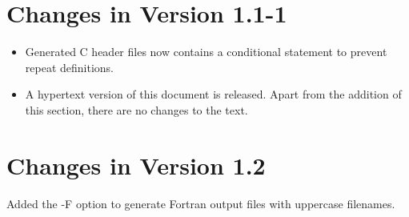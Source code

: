 \documentclass[11pt,nolof]{starlink}
\begin{document}
\section{Changes in Version 1.1-1}
\begin{itemize}
\item Generated C header files now contains a conditional statement to prevent
repeat definitions.
\item A hypertext version of this document is released. Apart from the
addition of this section, there are no changes to the text.
\end{itemize}

\section{Changes in Version 1.2}
Added the -F option to generate Fortran output files with uppercase filenames.
\end{document}
